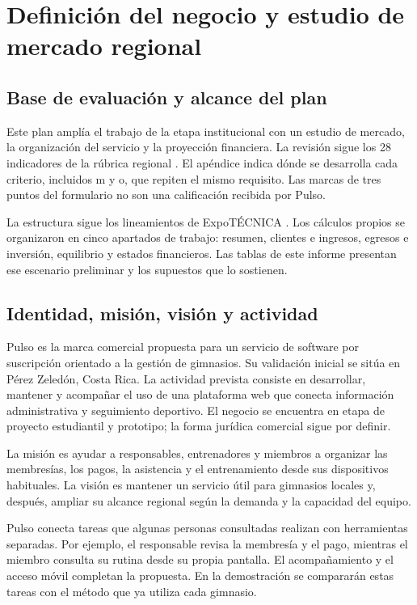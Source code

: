 \section{Definición del negocio y estudio de mercado regional}
\label{sec:mercado-regional}

\subsection{Base de evaluación y alcance del plan}

Este plan amplía el trabajo de la etapa institucional con un estudio de mercado,
la organización del servicio y la proyección financiera. La revisión sigue los
28 indicadores de la rúbrica regional \parencite{rubrica_plan_negocios_2026}.
El apéndice indica dónde se desarrolla cada criterio, incluidos m y o, que
repiten el mismo requisito. Las marcas de tres puntos del formulario no son
una calificación recibida por Pulso.

La estructura sigue los lineamientos de ExpoTÉCNICA \parencite{mep2026}.
Los cálculos propios se organizaron en cinco apartados de trabajo: resumen,
clientes e ingresos, egresos e inversión, equilibrio y estados financieros.
Las tablas de este informe presentan ese escenario preliminar y los supuestos
que lo sostienen.

\subsection{Identidad, misión, visión y actividad}

Pulso es la marca comercial propuesta para un servicio de software por suscripción
orientado a la gestión de gimnasios. Su validación inicial se sitúa en Pérez
Zeledón, Costa Rica. La actividad prevista consiste en desarrollar, mantener y
acompañar el uso de una plataforma web que conecta información administrativa y
seguimiento deportivo. El negocio se encuentra en etapa de proyecto estudiantil
y prototipo; la forma jurídica comercial sigue por definir.

La misión es ayudar a responsables, entrenadores y miembros a organizar las
membresías, los pagos, la asistencia y el entrenamiento desde sus dispositivos
habituales. La visión es mantener un servicio útil para gimnasios locales y,
después, ampliar su alcance regional según la demanda y la capacidad del equipo.

Pulso conecta tareas que algunas personas consultadas realizan con herramientas
separadas. Por ejemplo, el responsable revisa la membresía y el pago, mientras
el miembro consulta su rutina desde su propia pantalla. El acompañamiento y el
acceso móvil completan la propuesta. En la demostración se compararán estas
tareas con el método que ya utiliza cada gimnasio.

